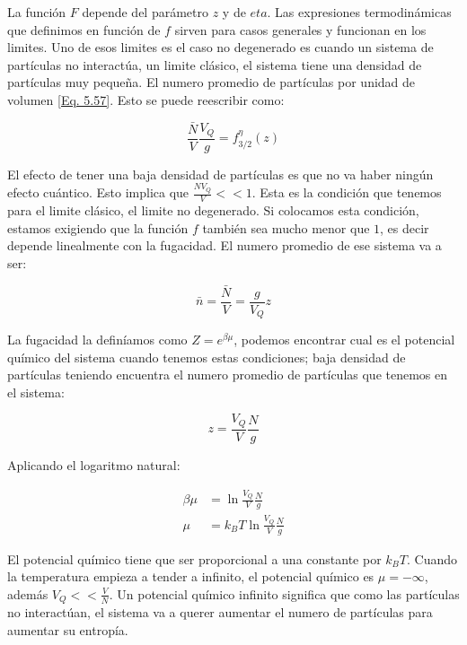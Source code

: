 \documentclass[11pt,fleqn]{book}
\begin{document}

La función $F$ depende del parámetro $z$ y de $eta$. Las expresiones termodinámicas que definimos en función de $f$ sirven para casos generales y funcionan en los limites. Uno de esos limites es el caso no degenerado es cuando un sistema de partículas no interactúa, un limite clásico, el sistema tiene una densidad de partículas muy pequeña. El numero promedio de partículas por unidad de volumen \ref{Eq. 5.57}. Esto se puede reescribir como:

\begin{equation}
    \frac{\bar{N}}{V}\frac{V_{Q}}{g}=f_{3/2}^{\eta}(z)
\end{equation}

El efecto de tener una baja densidad de partículas es que no va haber ningún efecto cuántico. Esto implica que $\frac{NV_{Q}}{V}<<1$. Esta es la condición que tenemos para el limite clásico, el limite no degenerado. Si colocamos esta condición, estamos exigiendo que la función $f$ también sea mucho menor que $1$, es decir depende linealmente con la fugacidad. El numero promedio de ese sistema va a ser:

\begin{equation}
    \bar{n}=\frac{\bar{N}}{V}=\frac{g}{V_{Q}}z
\end{equation}
 
La fugacidad la definíamos como $Z=e^{\beta\mu}$, podemos encontrar cual es el potencial químico del sistema cuando tenemos estas condiciones; baja densidad de partículas teniendo encuentra el numero promedio de partículas que tenemos en el sistema:

\begin{equation}
    z=\frac{V_{Q}}{V}\frac{N}{g}
\end{equation}

Aplicando el logaritmo natural:

\begin{equation}
     \begin{split}
        \beta\mu&=\ln{\frac{V_{Q}}{V}\frac{N}{g}}\\
        \mu&=k_{B}T\ln{\frac{V_{Q}}{V}\frac{N}{g}}
     \end{split}
\end{equation}

El potencial químico tiene que ser proporcional a una constante por $k_{B}T$. Cuando la temperatura empieza a tender a infinito, el potencial químico es $\mu=-\infty$, además $V_{Q}<<\frac{V}{N}$. Un potencial químico infinito significa que como las partículas no interactúan, el sistema va a querer aumentar el numero de partículas para aumentar su entropía.
\end{document}

